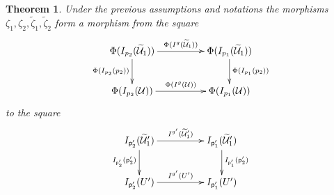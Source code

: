 \documentclass[12pt]{article}
\numberwithin{equation}{section}
\newtheorem{theorem}[proposition]{Theorem}
\newcommand{\llabel}[1]{\label{#1}}
\newcommand{\wt}{\widetilde}
\newcommand{\p}{\mathsf{p}}
\newcommand{\U}{\mathcal{U}}
\begin{document}
%
\begin{theorem}
\llabel{2015.04.10.th3} Under the previous assumptions and notations the
morphisms $\zeta_1,\zeta_2,\wt{\zeta}_1,\wt{\zeta}_2$ form a morphism from the
square
%
$$
\begin{xy}
          \xymatrix@C=4pc{ \Phi(I_{p_2}(\wt{\U}_1))
            \ar[r]^-{\Phi(I^g(\wt{\U}_1))} \ar[d]_{\Phi(I_{p_2}(p_2))} &
            \Phi(I_{p_1}(\wt{\U}_1))
            \ar[d]^{\Phi(I_{p_1}(p_2))}\\ \Phi(I_{p_2}(\U))
            \ar[r]^{\Phi(I^g(\U))} & \Phi(I_{p_1}(\U)) }
\end{xy}
$$
%
to the square
%
$$
\begin{xy}
          \xymatrix@C=4pc{
                 I_{\p_2'}(\wt{\U}_1')   \ar[r]^-{I^{g'}(\wt{\U}_1')} \ar[d]_{I_{\p_2'}(\p_2')} & 
                 I_{\p_1'}(\wt{\U}_1') \ar[d]^{I_{\p_1'}(\p_2')}\\
		I_{\p_2'}(U')   \ar[r]^{I^{g'}(U')} &
		I_{\p_1'}(U')
                }
\end{xy}
$$
%
\end{theorem}
%
\end{document}
